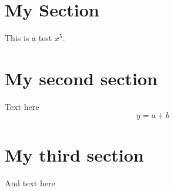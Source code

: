\documentclass{article}
\begin{document}
\section{My Section}
This is a test $x^5$.

\section{My second section}
Text here
\begin{equation}
  y = a + b
\end{equation}

\section{My third section}
And text here
\end{document}
